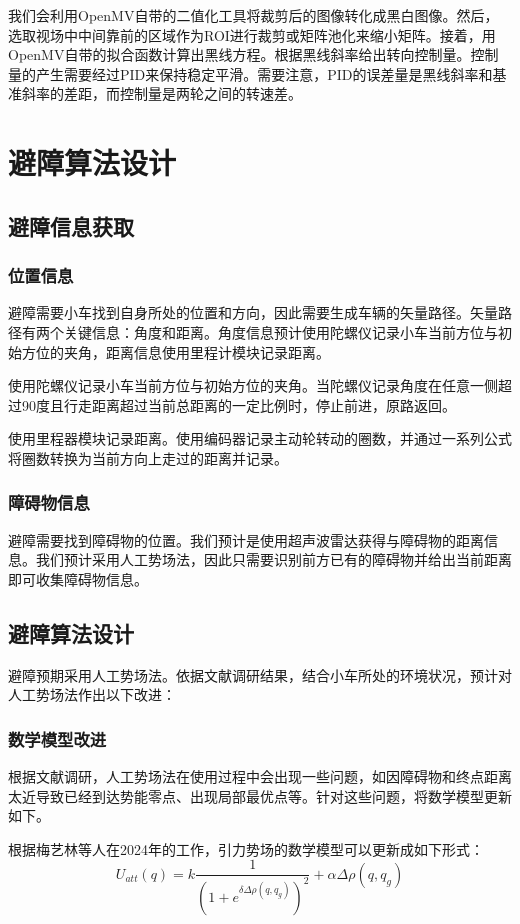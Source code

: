 \documentclass{report}
\begin{document}
我们会利用OpenMV自带的二值化工具将裁剪后的图像转化成黑白图像。然后，选取视场中中间靠前的区域作为ROI进行裁剪或矩阵池化来缩小矩阵。接着，用OpenMV自带的拟合函数计算出黑线方程。根据黑线斜率给出转向控制量。控制量的产生需要经过PID来保持稳定平滑。需要注意，PID的误差量是黑线斜率和基准斜率的差距，而控制量是两轮之间的转速差。
\section{避障算法设计}
\label{sec:label}
\subsection{避障信息获取}
\label{subsec:label}
\subsubsection{位置信息}
\label{subsec:label}
避障需要小车找到自身所处的位置和方向，因此需要生成车辆的矢量路径。矢量路径有两个关键信息：角度和距离。角度信息预计使用陀螺仪记录小车当前方位与初始方位的夹角，距离信息使用里程计模块记录距离。

使用陀螺仪记录小车当前方位与初始方位的夹角。当陀螺仪记录角度在任意一侧超过90度且行走距离超过当前总距离的一定比例时，停止前进，原路返回。

使用里程器模块记录距离。使用编码器记录主动轮转动的圈数，并通过一系列公式将圈数转换为当前方向上走过的距离并记录。

\subsubsection{障碍物信息}
\label{subsec:label}
避障需要找到障碍物的位置。我们预计是使用超声波雷达获得与障碍物的距离信息。我们预计采用人工势场法，因此只需要识别前方已有的障碍物并给出当前距离即可收集障碍物信息。
\subsection{避障算法设计}
\label{subsec:label}
避障预期采用人工势场法。依据文献调研结果，结合小车所处的环境状况，预计对人工势场法作出以下改进：
\subsubsection{数学模型改进}
\label{subsec:label}
根据文献调研，人工势场法在使用过程中会出现一些问题，如因障碍物和终点距离太近导致已经到达势能零点、出现局部最优点等。针对这些问题，将数学模型更新如下。

根据梅艺林等人在2024年的工作\cite{jh7}，引力势场的数学模型可以更新成如下形式：
\[ U_{att}(q)=k\frac1{\left(1+e^{\delta\Delta\rho(q,q_g)}\right)^2}+\alpha\Delta\rho(q,q_g) \]
\end{document}
